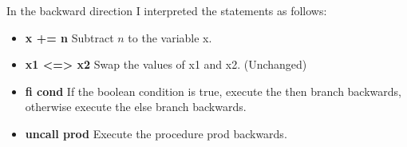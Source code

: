 \documentclass[12pt]{report}
\begin{document}
In the backward direction I interpreted the statements as follows:
\begin{itemize}
\item \textbf{ x += n } Subtract $n$ to the variable x.
\item \textbf{ x1 <=> x2 } Swap the values of x1 and x2. (Unchanged)
\item \textbf{ fi cond } If the boolean condition is true, execute the then branch backwards, otherwise execute the else branch backwards.
\item \textbf{ uncall prod } Execute the procedure prod backwards.
\end{itemize}
\end{document}
